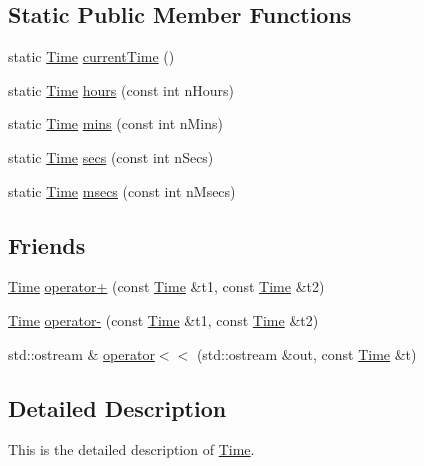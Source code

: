 \subsection*{Static Public Member Functions}
\begin{DoxyCompactItemize}
\item 
static \hyperlink{classprism_1_1_time}{Time} \hyperlink{classprism_1_1_time_acdaca1f67006f7be503752ce46add985}{current\+Time} ()
\item 
static \hyperlink{classprism_1_1_time}{Time} \hyperlink{classprism_1_1_time_a9d74e6da1536bf3a3d9b3611d10f555c}{hours} (const int n\+Hours)
\item 
static \hyperlink{classprism_1_1_time}{Time} \hyperlink{classprism_1_1_time_a4fad821cc7d1dc09b05c0eccca2a1f9e}{mins} (const int n\+Mins)
\item 
static \hyperlink{classprism_1_1_time}{Time} \hyperlink{classprism_1_1_time_afcce476fdb46b0aea8530c2e69d1044d}{secs} (const int n\+Secs)
\item 
static \hyperlink{classprism_1_1_time}{Time} \hyperlink{classprism_1_1_time_af6e8b6c1f49fc972aed397652c89e0be}{msecs} (const int n\+Msecs)
\end{DoxyCompactItemize}
\subsection*{Friends}
\begin{DoxyCompactItemize}
\item 
\hyperlink{classprism_1_1_time}{Time} \hyperlink{classprism_1_1_time_ae2e555aa5b5c51e44b576d8baf48a2cd}{operator+} (const \hyperlink{classprism_1_1_time}{Time} \&t1, const \hyperlink{classprism_1_1_time}{Time} \&t2)
\item 
\hyperlink{classprism_1_1_time}{Time} \hyperlink{classprism_1_1_time_a09225563b0b317910b26c550ba74de64}{operator-\/} (const \hyperlink{classprism_1_1_time}{Time} \&t1, const \hyperlink{classprism_1_1_time}{Time} \&t2)
\item 
std\+::ostream \& \hyperlink{classprism_1_1_time_a25f100a1404d8c5535ddaafe65081fa7}{operator$<$$<$} (std\+::ostream \&out, const \hyperlink{classprism_1_1_time}{Time} \&t)
\end{DoxyCompactItemize}


\subsection{Detailed Description}
This is the detailed description of \hyperlink{classprism_1_1_time}{Time}. 


